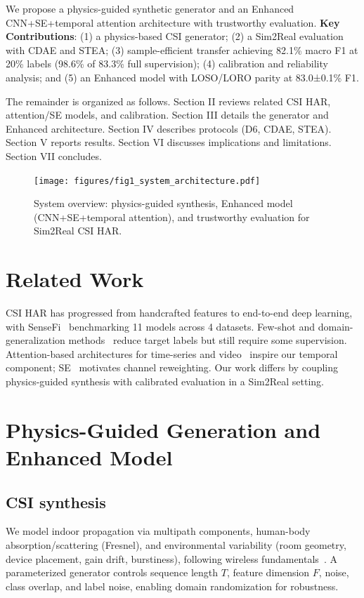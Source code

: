\documentclass[journal]{IEEEtran}
\begin{document}
We propose a physics-guided synthetic generator and an Enhanced CNN+SE+temporal attention architecture with trustworthy evaluation. \textbf{Key Contributions}: (1) a physics-based CSI generator; (2) a Sim2Real evaluation with CDAE and STEA; (3) sample-efficient transfer achieving 82.1\% macro F1 at 20\% labels (98.6\% of 83.3\% full supervision); (4) calibration and reliability analysis; and (5) an Enhanced model with LOSO/LORO parity at 83.0±0.1\% F1.

The remainder is organized as follows. Section II reviews related CSI HAR, attention/SE models, and calibration. Section III details the generator and Enhanced architecture. Section IV describes protocols (D6, CDAE, STEA). Section V reports results. Section VI discusses implications and limitations. Section VII concludes.

\begin{figure}[t]
\centering
\texttt{[image: figures/fig1\_system\_architecture.pdf]}
\caption{System overview: physics-guided synthesis, Enhanced model (CNN+SE+temporal attention), and trustworthy evaluation for Sim2Real CSI HAR.}
\label{fig:overview}
\end{figure}

\section{Related Work}
CSI HAR has progressed from handcrafted features to end-to-end deep learning, with SenseFi~\cite{yang2023sensefi} benchmarking 11 models across 4 datasets. Few-shot and domain-generalization methods~\cite{fewsense2022,airfi2022} reduce target labels but still require some supervision. Attention-based architectures for time-series and video~\cite{li2020tea,bertasius2021timesformer,lim2021tft,zhou2021informer} inspire our temporal component; SE~\cite{se_networks2018} motivates channel reweighting. Our work differs by coupling physics-guided synthesis with calibrated evaluation in a Sim2Real setting.

\section{Physics-Guided Generation and Enhanced Model}
\subsection{CSI synthesis}
We model indoor propagation via multipath components, human-body absorption/scattering (Fresnel), and environmental variability (room geometry, device placement, gain drift, burstiness), following wireless fundamentals~\cite{goldsmith2005wireless}. A parameterized generator controls sequence length $T$, feature dimension $F$, noise, class overlap, and label noise, enabling domain randomization for robustness.
\end{document}
